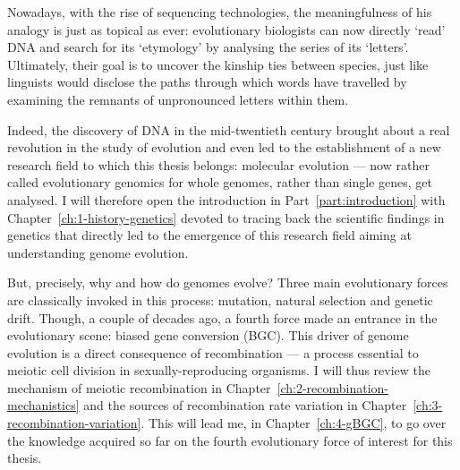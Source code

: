 Nowadays, with the rise of sequencing technologies, the meaningfulness of his analogy is just as topical as ever: evolutionary biologists can now directly ‘read’ DNA and search for its ‘etymology’ by analysing the series of its ‘letters’. 
Ultimately, their goal is to uncover the kinship ties between species, just like linguists would disclose the paths through which words have travelled by examining the remnants of unpronounced letters within them.

Indeed, the discovery of DNA in the mid-twentieth century \citep{franklin1953molecular,watson1953molecular,wilkins1953molecular} brought about a real revolution in the study of evolution and even led to the establishment of a new research field to which this thesis belongs: molecular evolution — now rather called evolutionary genomics for whole genomes, rather than single genes, get analysed.
I will therefore open the introduction in Part~\ref{part:introduction} with Chapter~\ref{ch:1-history-genetics} devoted to tracing back the scientific findings in genetics that directly led to the emergence of this research field aiming at understanding genome evolution.

But, precisely, why and how do genomes evolve?
Three main evolutionary forces are classically invoked in this process: mutation, natural selection and genetic drift.
Though, a couple of decades ago, a fourth force made an entrance in the evolutionary scene: biased gene conversion (BGC).
This driver of genome evolution is a direct consequence of recombination — a process essential to meiotic cell division in sexually-reproducing organisms. 
I will thus review the mechanism of meiotic recombination in Chapter~\ref{ch:2-recombination-mechanistics} and the sources of recombination rate variation in Chapter~\ref{ch:3-recombination-variation}. 
This will lead me, in Chapter~\ref{ch:4-gBGC}, to go over the knowledge acquired so far on the fourth evolutionary force of interest for this thesis.

